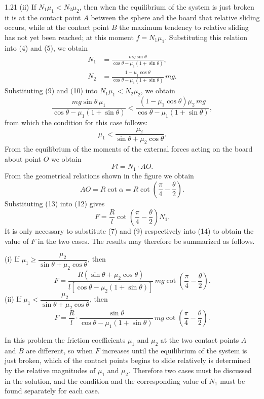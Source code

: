 \begin{solution}{1.21}
(ii) If $N_1\mu_1<N_2\mu_2$, then when the equilibrium of the system is just broken it is at the contact point $A$ between the sphere and the board that relative sliding occurs, while at the contact point $B$ the maximum tendency to relative sliding has not yet been reached; at this moment $f=N_1\mu_1$. Substituting this relation into (4) and (5), we obtain
\begin{align}
N_1&=\frac{mg\sin\theta}{\cos\theta-\mu_1(1+\sin\theta)}, \tag{9}\\
N_2&=\frac{1-\mu_1\cos\theta}{\cos\theta-\mu_1(1+\sin\theta)}\,mg. \tag{10}
\end{align}
Substituting (9) and (10) into $N_1\mu_1<N_2\mu_2$, we obtain
\[
\frac{mg\sin\theta\,\mu_1}{\cos\theta-\mu_1(1+\sin\theta)}
<\frac{(1-\mu_1\cos\theta)\mu_2\,mg}{\cos\theta-\mu_1(1+\sin\theta)},
\]
from which the condition for this case follows:
\begin{equation}
\mu_1<\frac{\mu_2}{\sin\theta+\mu_2\cos\theta}. \tag{11}
\end{equation}
From the equilibrium of the moments of the external forces acting on the board about point $O$ we obtain
\begin{equation}
Fl=N_1\cdot AO. \tag{12}
\end{equation}
From the geometrical relations shown in the figure we obtain
\begin{equation}
AO=R\cot\alpha=R\cot\left(\frac{\pi}{4}-\frac{\theta}{2}\right). \tag{13}
\end{equation}
Substituting (13) into (12) gives
\begin{equation}
F=\frac{R}{l}\cot\left(\frac{\pi}{4}-\frac{\theta}{2}\right)N_1. \tag{14}
\end{equation}
It is only necessary to substitute (7) and (9) respectively into (14) to obtain the value of $F$ in the two cases. The results may therefore be summarized as follows.

(i) If $\mu_1\geq\dfrac{\mu_2}{\sin\theta+\mu_2\cos\theta}$, then
\[
F=\frac{R(\sin\theta+\mu_2\cos\theta)}{l\left[\cos\theta-\mu_2(1+\sin\theta)\right]}\,mg\cot\left(\frac{\pi}{4}-\frac{\theta}{2}\right).
\]
(ii) If $\mu_1<\dfrac{\mu_2}{\sin\theta+\mu_2\cos\theta}$, then
\[
F=\frac{R}{l}\cdot\frac{\sin\theta}{\cos\theta-\mu_1(1+\sin\theta)}\,mg\cot\left(\frac{\pi}{4}-\frac{\theta}{2}\right).
\]

\begin{commentary}
In this problem the friction coefficients $\mu_1$ and $\mu_2$ at the two contact points $A$ and $B$ are different, so when $F$ increases until the equilibrium of the system is just broken, which of the contact points begins to slide relatively is determined by the relative magnitudes of $\mu_1$ and $\mu_2$. Therefore two cases must be discussed in the solution, and the condition and the corresponding value of $N_1$ must be found separately for each case.
\end{commentary}

\end{solution}

